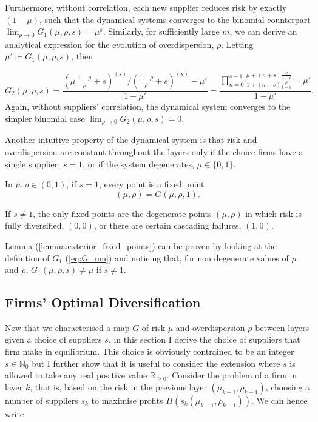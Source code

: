 \documentclass[../../main.tex]{subfiles}
\begin{document}
Furthermore, without correlation, each new supplier reduces risk by exactly $(1-\mu)$, such that the dynamical systems converges to the binomial counterpart $\lim_{\rho \rightarrow 0} G_1(\mu, \rho, s) = \mu^s$. Similarly, for sufficiently large $m$, we can derive an analytical expression for the evolution of overdispersion, $\rho$. Letting $\mu' \coloneqq G_1(\mu, \rho, s)$, then

\begin{equation}
  G_2(\mu, \rho, s) = \frac{\left( \mu \  \frac{1 - \rho}{\rho} + s \right)^{(s)} \Big/ \left( \frac{1 - \rho}{\rho} + s \right)^{(s)} - \mu'}{1 - \mu'} = \frac{\prod^{s - 1}_{n = 0} \frac{\mu + (n + s) \frac{\rho}{1 - \rho}}{1 + (n + s) \frac{\rho}{1 - \rho}} - \mu'}{1 - \mu'}.
\end{equation} Again, without suppliers' correlation, the dynamical system converges to the simpler binomial case $\lim_{\rho \rightarrow 0} G_2(\mu, \rho, s) = 0$.

Another intuitive property of the dynamical system is that risk and overdispersion are constant throughout the layers only if the choice firms have a single supplier, $s = 1$, or if the system degenerates, $\mu \in \{0, 1\}$. 

\begin{lemma} \label{lemma:interior_fixed_points}
  In $\mu, \rho \in (0, 1)$, if $s = 1$, every point is a fixed point \begin{equation}
    (\mu, \rho) = G(\mu, \rho, 1). 
  \end{equation}
\end{lemma}

\begin{lemma} \label{lemma:exterior_fixed_points}
  If $s \neq 1$, the only fixed points are the degenerate points $(\mu, \rho)$ in which risk is fully diversified, $(0, 0)$, or there are certain cascading failures, $(1, 0)$.
\end{lemma}

Lemma (\ref{lemma:exterior_fixed_points}) can be proven by looking at the definition of $G_1$ (\ref{eq:G_mu}) and noticing that, for non degenerate values of $\mu$ and $\rho$, $G_1(\mu, \rho, s) \neq \mu$ if $s \neq 1$.

\subsection{Firms' Optimal Diversification}

Now that we characterised a map $G$ of risk $\mu$ and overdispersion $\rho$ between layers given a choice of suppliers $s$, in this section I derive the choice of suppliers that firm make in equilibrium. This choice is obviously contrained to be an integer $s \in \mathbb{N}_{0}$ but I further show that it is useful to consider the extension where $s$ is allowed to take any real positive value $\mathbb{R}_{\geq 0}$. Consider the problem of a firm in layer $k$, that is, based on the risk in the previous layer $(\mu_{k - 1}, \rho_{k - 1})$, choosing a number of suppliers $s_k$ to maximise profits $\Pi(s_k(\mu_{k - 1}, \rho_{k - 1}))$. We can hence write
\end{document}
